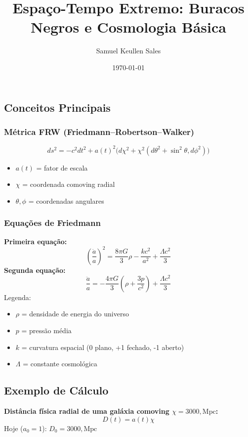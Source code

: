 \documentclass[12pt,a4paper]{article} \usepackage[utf8]{inputenc} \usepackage{amsmath, amssymb} \usepackage{geometry} \usepackage{hyperref} \usepackage{graphicx} \geometry{margin=1in} \title{Espaço-Tempo Extremo: Buracos Negros e Cosmologia Básica} \author{Samuel Keullen Sales} \date{\today}
\begin{document}
\subsection*{Conceitos Principais} \subsubsection*{Métrica FRW (Friedmann–Robertson–Walker)} \begin{equation} ds^2 = -c^2 dt^2 + a(t)^2 \big(d\chi^2 + \chi^2(d\theta^2 + \sin^2 \theta , d\phi^2)\big) \end{equation} \begin{itemize} \item $a(t)$ = fator de escala \item $\chi$ = coordenada comoving radial \item $\theta, \phi$ = coordenadas angulares \end{itemize}

\subsubsection*{Equações de Friedmann} \textbf{Primeira equação:} \begin{equation} \left(\frac{\dot{a}}{a}\right)^2 = \frac{8 \pi G}{3} \rho - \frac{k c^2}{a^2} + \frac{\Lambda c^2}{3} \end{equation} \textbf{Segunda equação:} \begin{equation} \frac{\ddot{a}}{a} = -\frac{4 \pi G}{3} \left(\rho + \frac{3p}{c^2}\right) + \frac{\Lambda c^2}{3} \end{equation} Legenda: \begin{itemize} \item $\rho$ = densidade de energia do universo \item $p$ = pressão média \item $k$ = curvatura espacial (0 plano, +1 fechado, -1 aberto) \item $\Lambda$ = constante cosmológica \end{itemize}

\subsection*{Exemplo de Cálculo} \textbf{Distância física radial de uma galáxia comoving $\chi = 3000 , \mathrm{Mpc}$:} \begin{equation} D(t) = a(t) \chi \end{equation} Hoje ($a_0 = 1$): $D_0 = 3000 , \mathrm{Mpc}$
\end{document}
